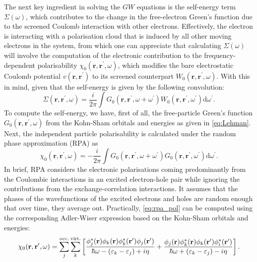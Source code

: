The next key ingredient in solving the $GW$ equations is the self-energy term $\Sigma(\omega)$, which contributes to the change in the free-electron Green's function due to the screened Coulomb interaction with other electrons. Effectively, the electron is interacting with a polarisation cloud that is induced by all other moving electrons in the system, from which one can appreciate that calculating $\Sigma(\omega)$ will involve the computation of the electronic contribution to the frequency-dependent polarisability $\chi_{0}(\bm{r},\bm{r}^\prime,\omega)$, which modifies the bare electrostatic Coulomb potential $v(\bm{r},\bm{r}^\prime)$ to its screened counterpart $W_{0}(\bm{r},\bm{r}^\prime,\omega)$. With this in mind, given that the self-energy is given by the following convolution:
\begin{equation}
    \label{eq:GW_self_energy}
    \Sigma(\bm{r},\bm{r}^\prime,\omega)=\frac{i}{2\pi}\int G_{0}(\bm{r},\bm{r}^\prime,\omega+\omega^\prime) W_0 (\bm{r},\bm{r}^\prime,\omega^\prime)\mbox{d}\omega^\prime.
\end{equation}
To compute the self-energy, we have, first of all, the free-particle Green's function $G_{0}(\bm{r},\bm{r}^\prime,\omega)$ from the Kohn-Sham orbitals and energies as given in \cref{eq:Lehman}. Next, the independent particle polarisability is calculated under the random phase approximation (RPA)\cite{ren2012random} as
\begin{equation}
    \label{eq:rpa_pol}
    \chi_0 (\bm{r},\bm{r}^\prime,\omega)=-\frac{i}{2\pi}\int G_{0}(\bm{r},\bm{r}^\prime,\omega+\omega^\prime) G_0 (\bm{r},\bm{r}^\prime,\omega^\prime)\mbox{d}\omega^\prime.
\end{equation}
In brief, RPA considers the electronic polarisations coming predominantly from the Coulombic interactions in an excited electron-hole pair while ignoring the contributions from the exchange-correlation interactions.  It assumes that the phases of the wavefunctions of the excited electrons and holes are random enough that over time, they average out. Practically, \cref{eq:rpa_pol} can be computed using the corresponding Adler-Wiser expression based on the Kohn-Sham orbitals and energies:\cite{adler1962quantum,wiser1963dielectric}
\begin{equation}
    \label{eq:adler-wiser}
     \chi_0 (\mathbf{r},\mathbf{r}^\prime,\omega)=\sum_j^{\mbox{\scriptsize{occ.}}}\sum_k^{\mbox{\scriptsize{virt.}}}\left[ \frac{\phi_j^{*}(\mathbf{r})\phi_k(\mathbf{r})\phi_k^{*}(\mathbf{r}^\prime)\phi_j(\mathbf{r}^\prime)}{\hbar\omega-(\varepsilon_k -\varepsilon_j)+i\eta} +\frac{\phi_j (\mathbf{r})\phi_{k}^{*}(\mathbf{r})\phi_{k}(\mathbf{r}^\prime)\phi_i^* (\mathbf{r}^\prime)}{\hbar\omega+(\varepsilon_k -\varepsilon_j)-i\eta}\right].
\end{equation}
